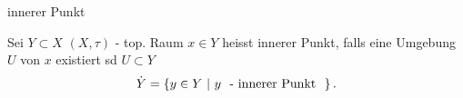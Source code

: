 \documentclass[class=article, crop=false]{standalone}
\begin{document}
\begin{zettel}{innerer Punkt}
\begin{flashcard}[]{}
	\begin{definition}
		Sei $Y \subset X$ $(X, \tau )$ - top. Raum $x \in  Y$ heisst innerer Punkt, falls eine Umgebung $U$ von $x$ existiert sd $U \subset Y$
		\[
			\dot{Y} = \set{y \in  Y}{y \tx{ - innerer Punkt } }
		.\]
	\end{definition}
\end{flashcard}
\end{zettel}
\end{document}

